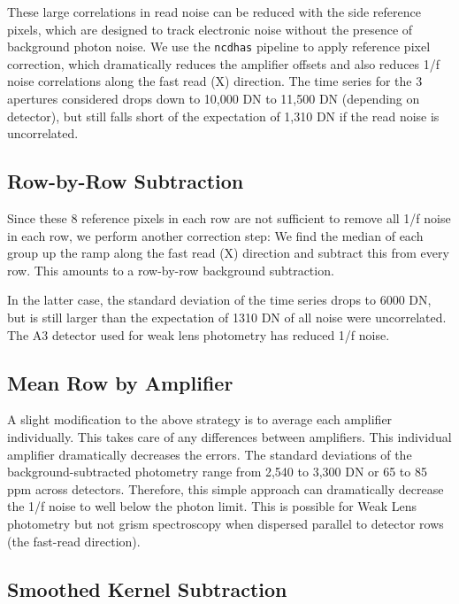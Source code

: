 \documentclass{aastex62}
\begin{document}
These large correlations in read noise can be reduced with the side reference pixels, which are designed to track electronic noise without the presence of background photon noise.
We use the \texttt{ncdhas} pipeline to apply reference pixel correction, which dramatically reduces the amplifier offsets and also reduces 1/f noise correlations along the fast read (X) direction.
The time series for the 3 apertures considered drops down to 10,000 DN to 11,500 DN (depending on detector), but still falls short of the expectation of 1,310 DN if the read noise is uncorrelated.

\subsection{Row-by-Row Subtraction}\label{sec:photRowByRow}

Since these 8 reference pixels in each row are not sufficient to remove all 1/f noise in each row, we perform another correction step:
We find the median of each group up the ramp along the fast read (X) direction and subtract this from every row.
This amounts to a row-by-row background subtraction.

In the latter case, the standard deviation of the time series drops to 6000 DN, but is still larger than the expectation of 1310 DN of all noise were uncorrelated.
The A3 detector used for weak lens photometry has reduced 1/f noise.

\subsection{Mean Row by Amplifier}\label{sec:indAmpAvg}
A slight modification to the above strategy is to average each amplifier individually.
This takes care of any differences between amplifiers.
This individual amplifier dramatically decreases the errors.
The standard deviations of the background-subtracted photometry range from 2,540 to 3,300 DN or 65 to 85 ppm across detectors.
Therefore, this simple approach can dramatically decrease the 1/f noise to well below the photon limit.
This is possible for Weak Lens photometry but not grism spectroscopy when dispersed parallel to detector rows (the fast-read direction).

\subsection{Smoothed Kernel Subtraction}\label{sec:smoothKernelSub}
\end{document}
